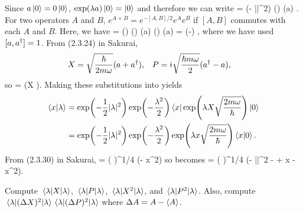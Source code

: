 \begin{solution}
	Since $a \ket{0} = 0 \ket{0}$, $\exp(\lambda a) \ket{0} = \ket{0}$ and therefore we can write
	\beqn \label{ugh1}
		\bkxlam = \exp(- |\lam|^2) \bx \exp(\lam \ad) \exp(\lam a) \ko.
	\eeqn
	For two operators $A$ and $B$, $e^{A + B} = e^{-[A, B] / 2} e^A e^B$ if $[A, B]$ commutes with each $A$ and $B$.  Here, we have
	\beq
		\exp[\lam(\ad + a)] = \exp() \exp(\lam \ad) \exp(\lam a) \implies \exp(\lam \ad) \exp(\lam a) = \exp(-) \exp[\lam(\ad + a)],
	\eeq
	where we have used $[a, a^\dagger] = 1$.  From (2.3.24) in Sakurai,
	\begin{align} \label{xpa}
		X &= \sqrt{\frac{\hbar}{2 m \omega}} (a + a^\dagger), &
		P &= i \sqrt{\frac{\hbar m \omega}{2}} (a^\dagger - a),
	\end{align}
	so
	\beq
		\exp[\lam(\ad + a)] = \exp(\lam X ).
	\eeq
	Making these substitutions into  yields
	\begin{align}
		\braket{x}{\lambda} &= \exp(-\frac{1}{2} |\lambda|^2) \exp(-\frac{\lambda^2}{2}) \bra{x} \exp(\lambda X \sqrt{\frac{2 m \omega}{\hbar}}) \ket{0} \notag \\
		&= \exp(-\frac{1}{2} |\lambda|^2) \exp(-\frac{\lambda^2}{2}) \exp(\lambda x \sqrt{\frac{2 m \omega}{\hbar}}) \braket{x}{0}. \label{ugh2}
	\end{align}
	From (2.3.30) in Sakurai,
	\beq
		\bkxo = \left(  \right)^{1/4} \exp(- x^2)
	\eeq
	so  becomes
	\beq
		\bkxlam = \left(  \right)^{1/4} \exp(- |\lam|^2 -  + \lam x  -  x^2).
	\eeq
\end{solution}

\newcommand{\Rel}{\Re(\lam)}
\newcommand{\Iml}{\Im(\lam)}

\clearpage
\begin{problem} \label{1.2}
	Compute $\ev{X}{\lam}$, $\ev{P}{\lam}$, $\ev{X^2}{\lam}$, and $\ev{P^2}{\lam}$.  Also, compute $\ev{(\DX)^2}{\lam} \ev{(\DP)^2}{\lam}$ where $\DA = A - \ev{A}$.
\end{problem}

